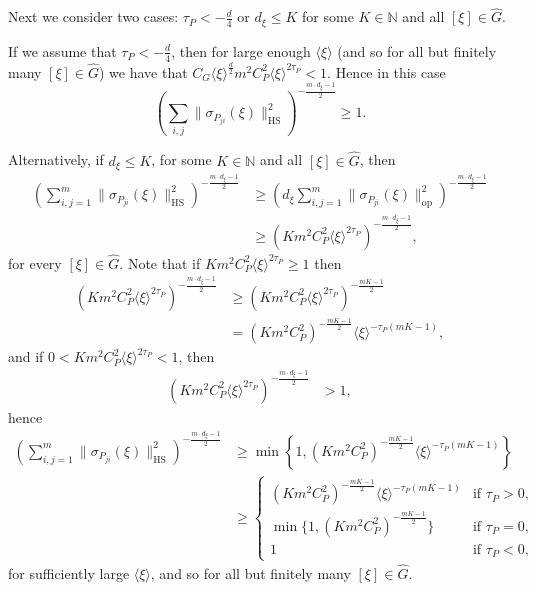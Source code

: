 \documentclass[11pt]{amsart}
\numberwithin{theorem}{section}
\numberwithin{equation}{section}
\theoremstyle{definition}
\numberwithin{example}{section}
\theoremstyle{definition}
\theoremstyle{definition}
\newcommand{\N}{\mathbb{N}}
\newcommand{\HS}{\operatorname{HS}}
\begin{document}
Next we consider two cases: $\tau_P<-\frac{d}{4}$ or $d_\xi\leq K$ for some $K\in\N$ and all $[\xi]\in\widehat{G}$.

If we assume that $\tau_P<-\frac{d}{4}$, then for large enough $\langle\xi\rangle$ (and so for all but finitely many $[\xi]\in\widehat{G}$) we have that $C_G\langle\xi\rangle^{\frac{d}{2}}m^2 C_P^2\langle\xi\rangle^{2\tau_P}<1$.
Hence in this case
\begin{equation*}
     \left({\sum_{i,j}\|\sigma_{P_{ji}}(\xi)\|_{\HS}^2}\right)^{-\frac{m\cdot d_\xi-1}{2}}\geq 1.
\end{equation*}

Alternatively, if $d_\xi\leq K$, for some  $K\in\N$ and all $[\xi]\in\widehat{G}$, then  
\begin{align*}
     \left({\sum_{i,j=1}^m\|\sigma_{P_{ji}}(\xi)\|_{\HS}^2}\right)^{-\frac{m\cdot d_\xi-1}{2}}&\geq \left(d_\xi{\sum_{i,j=1}^m\|\sigma_{P_{ji}}(\xi)\|_{\operatorname{op}}^2}\right)^{-\frac{m\cdot d_\xi-1}{2}}\\
     &\geq\left(Km^2 C_P^2\langle\xi\rangle^{2\tau_P}\right)^{-\frac{m\cdot d_\xi-1}{2}},
\end{align*}
for every $[\xi]\in\widehat{G}$. Note that if $Km^2C_P^2\langle\xi\rangle^{2\tau_P}\geq 1$ then
\begin{align*}
    \left(Km^2 C_P^2\langle\xi\rangle^{2\tau_P}\right)^{-\frac{m\cdot d_\xi-1}{2}}&\geq \left(Km^2 C_P^2\langle\xi\rangle^{2\tau_P}\right)^{-\frac{mK-1}{2}}\\
    &=\left(Km^2 C_P^2\right)^{-\frac{mK-1}{2}}\langle\xi\rangle^{-\tau_P(mK-1)},
\end{align*}
and if $0<Km^2C_P^2\langle\xi\rangle^{2\tau_P}< 1$, then 
\begin{align*}
    \left(Km^2 C_P^2\langle\xi\rangle^{2\tau_P}\right)^{-\frac{m\cdot d_\xi-1}{2}}&> 1,
\end{align*}
hence 
\begin{align*}
     \left({\sum_{i,j=1}^m\|\sigma_{P_{ji}}(\xi)\|_{\HS}^2}\right)^{-\frac{m\cdot d_\xi-1}{2}}&\geq \min\left\{1,\left(Km^2 C_P^2\right)^{-\frac{mK-1}{2}}\langle\xi\rangle^{-\tau_P(mK-1)}\right\}\\
     &\geq \begin{cases}
         \left(Km^2 C_P^2\right)^{-\frac{mK-1}{2}}\langle\xi\rangle^{-\tau_P(mK-1)}&\text{if }\tau_P>0,\\
         \min\{1,\left(Km^2 C_P^2\right)^{-\frac{mK-1}{2}}\}&\text{if }\tau_P=0,\\
         1&\text{if }\tau_P<0,
     \end{cases}
\end{align*}
for sufficiently large $\langle\xi\rangle$, and so for all but finitely many $[\xi]\in\widehat{G}$.
\end{document}
